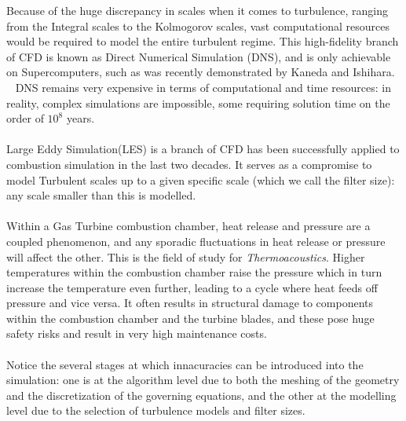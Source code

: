 \documentclass[titlepage,11pt,letterpaper]{article}
\begin{document}
\noindent Because of the huge discrepancy in scales when it comes to turbulence, ranging from the Integral scales to the Kolmogorov scales, vast computational resources would be required to model the entire turbulent regime. This high-fidelity branch of CFD is known as Direct Numerical Simulation (DNS), and is only achievable on Supercomputers, such as was recently demonstrated by Kaneda and Ishihara. ~\cite{kaneda:2006} DNS remains very expensive in terms of  computational and time resources: in reality, complex simulations are impossible, some requiring solution time on the order of $10^8$ years.\\ \\
\noindent Large Eddy Simulation(LES) is a branch of CFD has been successfully applied to combustion simulation in the last two decades. It serves as a compromise to model Turbulent scales up to a given specific scale (which we call the filter size): any scale smaller than this is modelled. \\ \\
\noindent Within a Gas Turbine combustion chamber, heat release and pressure are a coupled phenomenon, and any sporadic fluctuations in heat release or pressure will affect the other. This is the field of study for \textit{Thermoacoustics}. Higher temperatures within the combustion chamber raise the pressure which in turn increase the temperature even further, leading to a cycle where heat feeds off pressure and vice versa. It often results in structural damage to components within the combustion chamber and the turbine blades, and these pose huge safety risks and result in very high maintenance costs.\\ \\
\noindent Notice the several stages at which innacuracies can be introduced into the simulation: one is at the algorithm level due to both the meshing of the geometry and the discretization of the governing equations, and the other at the modelling level due to the selection of turbulence models and filter sizes. \\ 



\end{document}
